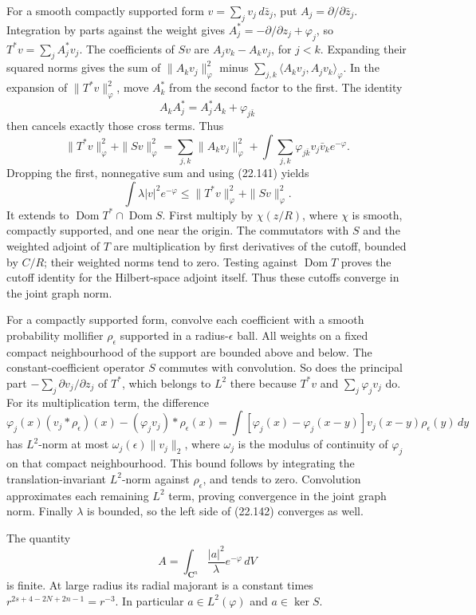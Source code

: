 \documentclass[
  11pt,
  a4paper,
]{article}
\begin{document}
For a smooth compactly supported form \(v=\sum_jv_j\,d\bar z_j\), put
\(A_j=\partial/\partial\bar z_j\). Integration by parts against the
weight gives \(A_j^*=-\partial/\partial z_j+\varphi_j\), so
\(T^*v=\sum_j A_j^*v_j\). The coefficients of \(Sv\) are
\(A_jv_k-A_kv_j\), for \(j<k\). Expanding their squared norms gives the
sum of \(\|A_kv_j\|_\varphi^2\) minus
\(\sum_{j,k}\langle A_kv_j,A_jv_k\rangle_\varphi\). In the expansion of
\(\|T^*v\|_\varphi^2\), move \(A_k^*\) from the second factor to the
first. The identity \[
 A_kA_j^*=A_j^*A_k+\varphi_{j\bar k}
\] then cancels exactly those cross terms. Thus \[
 \|T^*v\|_\varphi^2+\|Sv\|_\varphi^2
 =\sum_{j,k}\|A_kv_j\|_\varphi^2
  +\int\sum_{j,k}\varphi_{j\bar k}v_j\bar v_k e^{-\varphi}.
\] Dropping the first, nonnegative sum and using (22.141) yields \[
 \int\lambda|v|^2e^{-\varphi}
 \le\|T^*v\|_\varphi^2+\|Sv\|_\varphi^2.
 \tag{22.142}
\] It extends to \(\operatorname{Dom}T^*\cap\operatorname{Dom}S\). First
multiply by \(\chi(z/R)\), where \(\chi\) is smooth, compactly
supported, and one near the origin. The commutators with \(S\) and the
weighted adjoint of \(T\) are multiplication by first derivatives of the
cutoff, bounded by \(C/R\); their weighted norms tend to zero. Testing
against \(\operatorname{Dom}T\) proves the cutoff identity for the
Hilbert-space adjoint itself. Thus these cutoffs converge in the joint
graph norm.

For a compactly supported form, convolve each coefficient with a smooth
probability mollifier \(\rho_\epsilon\) supported in a
radius-\(\epsilon\) ball. All weights on a fixed compact neighbourhood
of the support are bounded above and below. The constant-coefficient
operator \(S\) commutes with convolution. So does the principal part
\(-\sum_j\partial v_j/\partial z_j\) of \(T^*\), which belongs to
\(L^2\) there because \(T^*v\) and \(\sum_j\varphi_jv_j\) do. For its
multiplication term, the difference \[
 \varphi_j(x)(v_j*\rho_\epsilon)(x)
       -(\varphi_jv_j)*\rho_\epsilon(x)
 =\int[\varphi_j(x)-\varphi_j(x-y)]v_j(x-y)\rho_\epsilon(y)\,dy
\] has \(L^2\)-norm at most \(\omega_j(\epsilon)\|v_j\|_2\), where
\(\omega_j\) is the modulus of continuity of \(\varphi_j\) on that
compact neighbourhood. This bound follows by integrating the
translation-invariant \(L^2\)-norm against \(\rho_\epsilon\), and tends
to zero. Convolution approximates each remaining \(L^2\) term, proving
convergence in the joint graph norm. Finally \(\lambda\) is bounded, so
the left side of (22.142) converges as well.

The quantity \[
 A=\int_{\mathbf C^n}\frac{|a|^2}{\lambda}e^{-\varphi}\,dV
 \tag{22.143}
\] is finite. At large radius its radial majorant is a constant times
\(r^{2s+4-2N+2n-1}=r^{-3}\). In particular \(a\in L^2(\varphi)\) and
\(a\in\ker S\).
\end{document}
